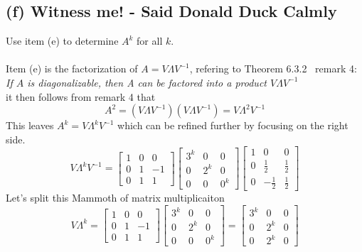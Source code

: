 \documentclass[12pt]{article}
\begin{document}
\subsection*{(f) Witness me! - Said Donald Duck Calmly}
Use item (e) to determine $A^k$ for all $k$.\\\\
Item (e) is the factorization of $A = V \Lambda V^{-1}$, refering to Theorem 6.3.2~\cite{LinearAlgApp} remark 4:\\
\textit{If $A$ is diagonalizable, then A can be factored into a product $V\Lambda V^{-1}$}\\
it then follows from remark 4 that
\begin{equation*}
    A^2 = (V \Lambda V^{-1})(V \Lambda V^{-1}) = V\Lambda^2 V^{-1}
\end{equation*}
This leaves $A^k = V\Lambda^k V^{-1}$ which can be refined further by focusing on the right side.
\begin{equation*}
    V\Lambda^k V^{-1} =  \begin{bmatrix}
        1 & 0 & 0 \\
        0 & 1 & -1 \\
        0 & 1 & 1
    \end{bmatrix} \begin{bmatrix}
        3^k & 0 & 0 \\
        0 & 2^k & 0 \\
        0 & 0 & 0^k
    \end{bmatrix} \begin{bmatrix}
        1 & 0 & 0 \\
        0 & \frac{1}{2} & \frac{1}{2} \\
        0 & -\frac{1}{2} & \frac{1}{2}
    \end{bmatrix}
\end{equation*}
Let's split this Mammoth of matrix multiplicaiton
\begin{equation*}
    V \Lambda^k = \begin{bmatrix}
        1 & 0 & 0 \\
        0 & 1 & -1 \\
        0 & 1 & 1
    \end{bmatrix} \begin{bmatrix}
        3^k & 0 & 0 \\
        0 & 2^k & 0 \\
        0 & 0 & 0^k
    \end{bmatrix} = \begin{bmatrix}
        3^k & 0 & 0 \\
        0 & 2^k & 0 \\
        0 & 2^k & 0
    \end{bmatrix}
\end{equation*}
\end{document}
